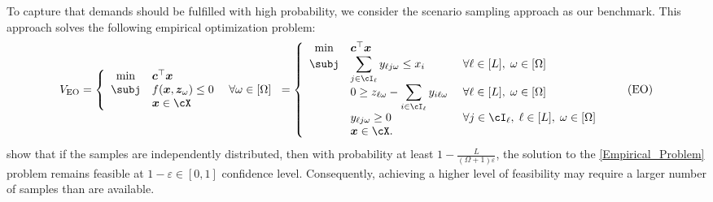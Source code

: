\documentclass[mnsc, nonblindrev]{informswp}
\newcommand{\1}[1]{\mathds{1}{\left(#1\right)}}
\begin{document}
To capture that demands should be fulfilled with high probability, we consider the scenario sampling approach \citep{calafiore2005uncertain} as our benchmark. This approach solves the following empirical optimization problem:
\begin{equation} 
\label{Empirical_Problem}
V_{\mathrm{EO}} = \left\{
\begin{array}{cll}
\min & \bm c^\top \bm x \\
     \subj 
     & \displaystyle f(\bm x,\bm z_\omega)  \leq 0 &~\forall \omega \in [\Omega] \\
     & \displaystyle  {\bm x} \in \cX
\end{array} \right.
= \left\{
\begin{array}{cll}
\min &  \bm c^\top \bm x \\
     \subj 
     & \displaystyle \sum_{j \in \cI_\ell} y_{\ell j\omega} \leq x_i &~\forall \ell \in [L], \; \omega \in [\Omega]\\
     & \displaystyle 0\geq z_{\ell \omega} - \sum_{i \in \cI_{\ell}} y_{i \ell \omega} &~\forall \ell \in [L], \; \omega \in [\Omega] \\
     & \displaystyle y_{\ell j\omega} \geq 0 &~\forall  j \in \cI_{\ell}, \; \ell \in [L], \; \omega \in [\Omega] \\ 
     &  {\bm x} \in \cX.
\end{array} \right.
\tag{EO}
\end{equation}
\cite{calafiore2005uncertain} show that if the samples are independently distributed, then with probability at least $1 - \frac{L}{(\Omega + 1)\varepsilon}$, the solution to the \ref{Empirical_Problem} problem remains feasible at $1-\varepsilon \in [0,1]$ confidence level. Consequently, achieving a higher level of feasibility may require a larger number of samples than are available.
\end{document}
